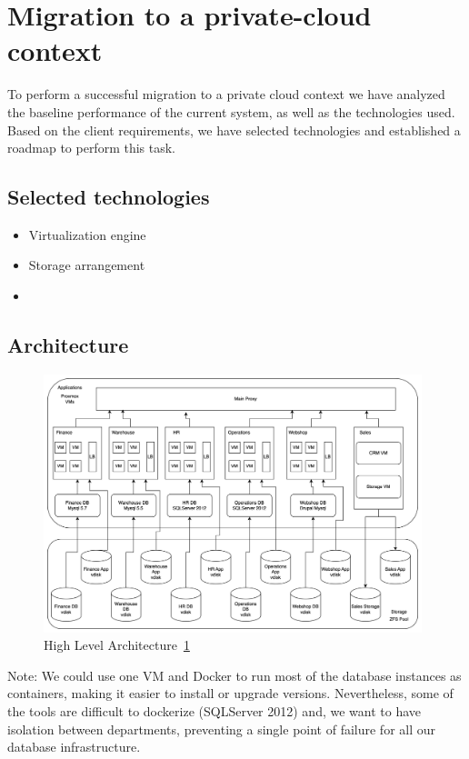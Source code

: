 \documentclass{llncs}
\begin{document}
\section{Migration to a private-cloud context}

To perform a successful migration to a private cloud context we have analyzed the baseline performance of the current system, as well as the technologies used. Based on the client requirements, we have selected technologies and established a roadmap to perform this task.   

\subsection{Selected technologies}

\begin{itemize}
  \item Virtualization engine
  \item Storage arrangement
  \item 
\end{itemize}

\newpage

\subsection{Architecture}

\begin{figure}[htbp]
  \begin{center}
    \includegraphics[width=11cm]{diagrams/architecture.drawio.png}
    \caption{High Level Architecture~\ref{High_Level_Architecture}}
    \label{High_Level_Architecture} %
  \end{center}
\end{figure}

Note: We could use one VM and Docker to run most of the database instances as containers, making it easier to install or upgrade versions. Nevertheless, some of the tools are difficult to dockerize (SQLServer 2012) and, we want to have isolation between departments, preventing a single point of failure for all our database infrastructure.
\end{document}
